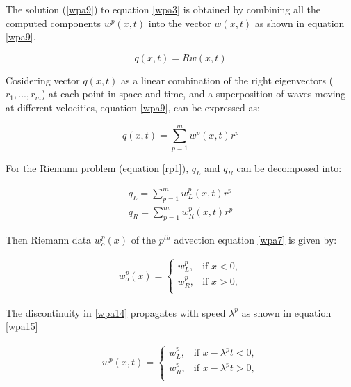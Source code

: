 \documentclass[12pt,a4paper]{article}
\begin{document}
   \noindent The solution (\eqref{wpa9}) to equation \eqref{wpa3} is obtained by combining all the computed components $w^{p} (x,t)$ into the vector $w(x,t)$ as shown in equation \eqref{wpa9}.
   
   \begin{equation}
   	q(x,t) = Rw(x,t)
   	\label{wpa9}
   \end{equation}
   
   \noindent Cosidering vector $q(x,t)$ as a linear combination of the right eigenvectors ($r_{1}, ...,r_{m}$) at each point in space and time, and a superposition of waves moving at different velocities, equation \eqref{wpa9}, can  be expressed as:
   
   \begin{equation}
   	q(x,t) = \sum_{p=1}^{m} w^{p}(x,t) r^{p}
   	\label{wpa10}
   \end{equation}
   
   \noindent For the Riemann problem (equation \eqref{rp1}), $q_{L}$ and $q_{R}$ can be decomposed into:
   
   \begin{eqnarray}
   	q_{L} = \sum_{p=1}^{m} w_{L}^{p}(x,t) r^{p} 
   	\label{wpa11}\\
   	q_{R} = \sum_{p=1}^{m} w_{R}^{p}(x,t) r^{p} 
   	\label{wpa12}
   \end{eqnarray}

	\noindent Then Riemann data $w_{o}^{p} (x)$  of the $p^{th}$ advection equation \eqref{wpa7} is given by:
	
	 \begin{eqnarray}
		w_{o}^{p} (x) = \begin{cases}
			w_{L}^{p}, & \text{if $x < 0,$}\\
			w_{R}^{p},& \text{if $x > 0,$}\\
			
		\end{cases}  
		\label{wpa14}     
	\end{eqnarray}
	
	\noindent The discontinuity in \eqref{wpa14} propagates with speed $\lambda^{p}$ as shown in equation \eqref{wpa15}
	
	\begin{eqnarray}
		w^{p} (x,t) = \begin{cases}
			w_{L}^{p}, & \text{if $x - \lambda^{p} t < 0,$}\\
			w_{R}^{p},& \text{if $x  - \lambda^{p} t > 0,$}\\
			
		\end{cases}  
		\label{wpa15}     
	\end{eqnarray}
	
\end{document}
